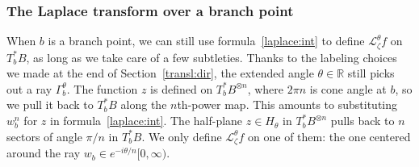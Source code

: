 \documentclass{article}
\newcommand{\maps}{\colon}
\newcommand{\R}{\mathbb{R}}
\newcommand{\C}{\mathbb{C}}
\newcommand{\laplace}{\mathcal{L}}
\newcommand{\borel}{\mathcal{B}}
\theoremstyle{definition}
\theoremstyle{plain}
\begin{document}
\subsubsection{The Laplace transform over a branch point}
When $b$ is a branch point, we can still use formula~\eqref{laplace:int} to define $\laplace_\zeta^\theta f$ on $T_b^*B$, as long as we take care of a few subtleties. Thanks to the labeling choices we made at the end of Section~\ref{transl:dir}, the extended angle $\theta \in \R$ still picks out a ray $\Gamma_b^\theta$. The function $z$ is defined on $T_b^*B^{\otimes n}$, where $2\pi n$ is cone angle at $b$, so we pull it back to $T^*_bB$ along the $n$th-power map. This amounts to substituting $w_b^n$ for $z$ in formula~\eqref{laplace:int}. The half-plane $z \in H_{\theta}$ in $T_b^*B^{\otimes n}$ pulls back to $n$ sectors of angle $\pi/n$ in $T_b^*B$. We only define $\laplace_\zeta^\theta f$ on one of them: the one centered around the ray $w_b \in e^{-i\theta/n}[0, \infty)$.
\end{document}
